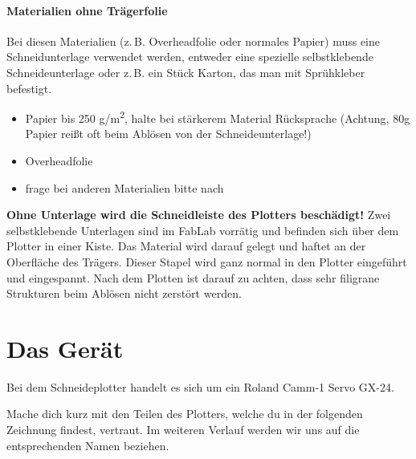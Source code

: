 \documentclass{\basedir/fablab-document}
\begin{document}
\paragraph{Materialien ohne Trägerfolie}


Bei diesen Materialien (z.\,B. Overheadfolie oder normales Papier) muss eine Schneidunterlage verwendet werden,
entweder eine spezielle selbstklebende Schneideunterlage oder z.\,B. ein Stück Karton, das man mit Sprühkleber befestigt.  
\begin{itemize}
 \item Papier bis 250 \si{g/m^2}, halte bei stärkerem Material Rücksprache (Achtung, 80g Papier reißt oft beim Ablösen von der Schneideunterlage!)
 \item Overheadfolie
 \item frage bei anderen Materialien bitte nach
\end{itemize}

\textbf{Ohne Unterlage wird die Schneidleiste des Plotters beschädigt!}
Zwei selbstklebende Unterlagen sind im FabLab vorrätig und befinden sich über dem Plotter in einer Kiste.
Das Material wird darauf gelegt und haftet an der Oberfläche des Trägers.
Dieser Stapel wird ganz normal in den Plotter eingeführt und eingespannt.
Nach dem Plotten ist darauf zu achten, dass sehr filigrane Strukturen beim Ablösen nicht zerstört werden.


\tableofcontents

\section{Das Gerät}
Bei dem Schneideplotter handelt es sich um ein Roland Camm-1 Servo GX-24. 

Mache dich kurz mit den Teilen des Plotters, welche du in der folgenden Zeichnung findest, vertraut.
Im weiteren Verlauf werden wir uns auf die entsprechenden Namen beziehen.
\end{document}
